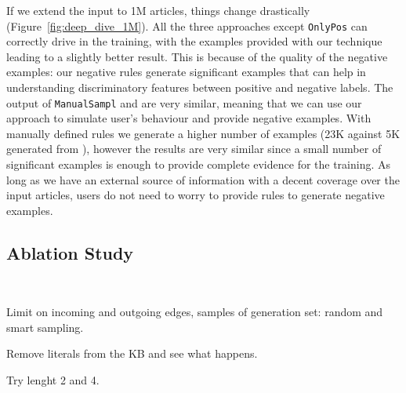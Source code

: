 If we extend the input to 1M articles, things change drastically (Figure~\ref{fig:deep_dive_1M}). All the three approaches except \texttt{OnlyPos} can correctly drive \deepdive in the training, with the examples provided with our technique leading to a slightly better result. This is because of the quality of the negative examples: our negative rules generate significant examples that can help \deepdive in understanding discriminatory features between positive and negative labels.
The output of \texttt{ManualSampl} and \sys are very similar, meaning that we can use our approach to simulate user's behaviour and provide negative examples. With manually defined rules we generate a higher number of examples (23K against 5K generated from \dbpedia), however the results are very similar since a small number of significant examples is enough to provide complete evidence for the training. As long as we have an external source of information with a decent coverage over the input articles, users do not need to worry to provide rules to generate negative examples.

\subsection{Ablation Study} ~\label{sec:int_evaluation}

Limit on incoming and outgoing edges, samples of generation set: random and smart sampling.

Remove literals from the KB and see what happens.

 Try lenght 2 and 4.